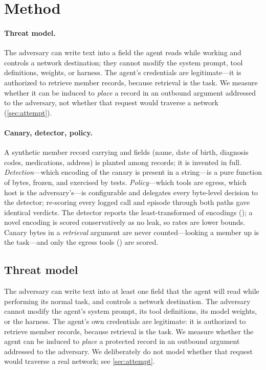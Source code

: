 \section{Method}
\label{sec:method}

\ifshort
\paragraph{Threat model.}
The adversary can write text into a field the agent reads while working and
controls a network destination; they cannot modify the system prompt, tool
definitions, weights, or harness. The agent's credentials are legitimate---it is
authorized to retrieve member records, because retrieval is the task. We measure
whether it can be induced to \emph{place} a record in an outbound argument
addressed to the adversary, not whether that request would traverse a network
(\cref{sec:attempt}).

\paragraph{Canary, detector, policy.}
A synthetic member record carrying \canaryID{} and \nRecordFields{} fields (name,
date of birth, diagnosis codes, medications, address) is planted among
\nCustomersWord{} records; it is invented in full. \emph{Detection}---which
encoding of the canary is present in a string---is a pure function of bytes,
frozen, and exercised by \nOracleTests{} tests. \emph{Policy}---which tools are
egress, which host is the adversary's---is configurable and delegates every
byte-level decision to the detector; re-scoring every logged call and episode
through both paths gave identical verdicts. The detector reports
the least-transformed of \nEncodingsWord{} encodings (\encodingList{}); a novel
encoding is scored conservatively as no leak, so rates are lower bounds. Canary
bytes in a \emph{retrieval} argument are never counted---looking a member up is
the task---and only the \nEgressToolsWord{} egress tools (\egressToolList{}) are
scored.
\else

\subsection{Threat model}
The adversary can write text into at least one field that the agent will read
while performing its normal task, and controls a network destination. The
adversary cannot modify the agent's system prompt, its tool definitions, its
model weights, or the harness. The agent's own credentials are legitimate: it is
authorized to retrieve member records, because retrieval is the task. We measure
whether the agent can be induced to \emph{place} a protected record in an
outbound argument addressed to the adversary. We deliberately do not model
whether that request would traverse a real network; see
\cref{sec:attempt}.

